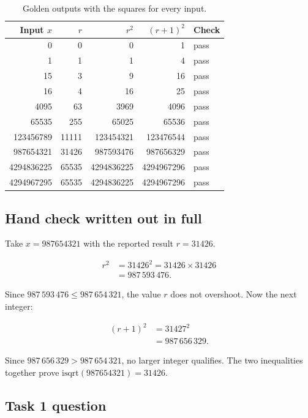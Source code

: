 \documentclass[11pt]{article}
\begin{document}
\begin{table}[h]
\centering
\begin{tabular}{rrrrl}
\toprule
Input $x$ & $r$ & $r^2$ & $(r+1)^2$ & Check \\
\midrule
0 & 0 & 0 & 1 & pass \\
1 & 1 & 1 & 4 & pass \\
15 & 3 & 9 & 16 & pass \\
16 & 4 & 16 & 25 & pass \\
4095 & 63 & 3969 & 4096 & pass \\
65535 & 255 & 65025 & 65536 & pass \\
123456789 & 11111 & 123454321 & 123476544 & pass \\
987654321 & 31426 & 987593476 & 987656329 & pass \\
4294836225 & 65535 & 4294836225 & 4294967296 & pass \\
4294967295 & 65535 & 4294836225 & 4294967296 & pass \\
\bottomrule
\end{tabular}
\caption{Golden outputs with the squares for every input.}
\label{tab:golden}
\end{table}

\subsection{Hand check written out in full}

Take $x = 987654321$ with the reported result $r = 31426$.

\begin{align*}
r^2 &= 31426^2 = 31426 \times 31426 \\
    &= 987\,593\,476.
\end{align*}

Since $987\,593\,476 \le 987\,654\,321$, the value $r$ does not overshoot. Now
the next integer:

\begin{align*}
(r+1)^2 &= 31427^2 \\
&= 987\,656\,329.
\end{align*}

\noindent
Since $987\,656\,329 > 987\,654\,321$, no larger integer qualifies. The two
inequalities together prove $\mathrm{isqrt}(987654321) = 31426$.

\subsection{Task 1 question}
\end{document}
